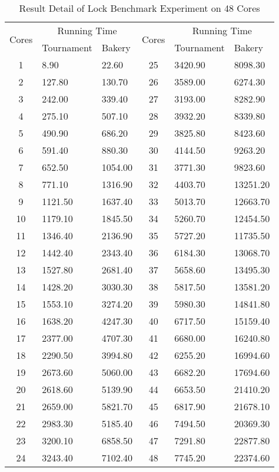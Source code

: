 \documentclass{article}
\begin{document}
\begin{table}[H]
    \caption{Result Detail of Lock Benchmark Experiment on 48 Cores}
    \label{exp_table_48}
    \centering
    \begin{tabular}{c|ll|c|ll}
        \toprule
        \multirow{2}{*}{Cores} & \multicolumn{2}{|c|}{Running Time} &
        \multirow{2}{*}{Cores} & \multicolumn{2}{|c}{Running Time} \\
                               & Tournament & Bakery & & Tournament & Bakery \\\midrule
        1 & 8.90 & 22.60 & 25 & 3420.90 & 8098.30 \\
        2 & 127.80 & 130.70 & 26 & 3589.00 & 6274.30 \\
        3 & 242.00 & 339.40 & 27 & 3193.00 & 8282.90 \\
        4 & 275.10 & 507.10 & 28 & 3932.20 & 8339.80 \\
        5 & 490.90 & 686.20 & 29 & 3825.80 & 8423.60 \\
        6 & 591.40 & 880.30 & 30 & 4144.50 & 9263.20 \\
        7 & 652.50 & 1054.00 & 31 & 3771.30 & 9823.60 \\
        8 & 771.10 & 1316.90 & 32 & 4403.70 & 13251.20 \\
        9 & 1121.50 & 1637.40 & 33 & 5013.70 & 12663.70 \\
        10 & 1179.10 & 1845.50 & 34 & 5260.70 & 12454.50 \\
        11 & 1346.40 & 2136.90 & 35 & 5727.20 & 11735.50 \\
        12 & 1442.40 & 2343.40 & 36 & 6184.30 & 13068.70 \\
        13 & 1527.80 & 2681.40 & 37 & 5658.60 & 13495.30 \\
        14 & 1428.20 & 3030.30 & 38 & 5817.50 & 13581.20 \\
        15 & 1553.10 & 3274.20 & 39 & 5980.30 & 14841.80 \\
        16 & 1638.20 & 4247.30 & 40 & 6717.50 & 15159.40 \\
        17 & 2377.00 & 4707.30 & 41 & 6680.00 & 16240.80 \\
        18 & 2290.50 & 3994.80 & 42 & 6255.20 & 16994.60 \\
        19 & 2673.60 & 5060.00 & 43 & 6682.20 & 17694.60 \\
        20 & 2618.60 & 5139.90 & 44 & 6653.50 & 21410.20 \\
        21 & 2659.00 & 5821.70 & 45 & 6817.90 & 21678.10 \\
        22 & 2983.30 & 5185.40 & 46 & 7494.50 & 20369.30 \\
        23 & 3200.10 & 6858.50 & 47 & 7291.80 & 22877.80 \\
        24 & 3243.40 & 7102.40 & 48 & 7745.20 & 22374.60 \\
        \bottomrule
    \end{tabular}
\end{table}
\end{document}
